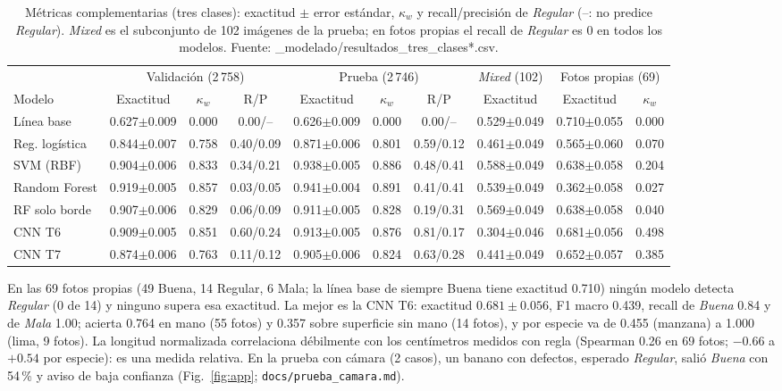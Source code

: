 \documentclass[conference]{IEEEtran}
\begin{document}
\begin{table}[t]
\centering
\caption{M\'etricas complementarias (tres clases): exactitud $\pm$ error est\'andar, $\kappa_w$ y recall/precisi\'on de \emph{Regular} (--: no predice \emph{Regular}). \emph{Mixed} es el subconjunto de 102 im\'agenes de la prueba; en fotos propias el recall de \emph{Regular} es 0 en todos los modelos. Fuente: {\normalfont{}\_modelado/resultados\_tres\_clases*.csv}.}
\label{tab:met}
\scriptsize
\setlength{\tabcolsep}{3.5pt}
\begin{tabular}{@{}l ccc ccc c cc@{}}
\toprule
 & \multicolumn{3}{c}{Validaci\'on (2\,758)} & \multicolumn{3}{c}{Prueba (2\,746)} & \emph{Mixed} (102) & \multicolumn{2}{c}{Fotos propias (69)} \\
\cmidrule(lr){2-4}\cmidrule(lr){5-7}\cmidrule(lr){8-8}\cmidrule(l){9-10}
Modelo & Exactitud & $\kappa_w$ & R/P & Exactitud & $\kappa_w$ & R/P & Exactitud & Exactitud & $\kappa_w$ \\
\midrule
L\'inea base & 0.627$\pm$0.009 & 0.000 & 0.00/-- & 0.626$\pm$0.009 & 0.000 & 0.00/-- & 0.529$\pm$0.049 & 0.710$\pm$0.055 & 0.000 \\
Reg. log\'istica & 0.844$\pm$0.007 & 0.758 & 0.40/0.09 & 0.871$\pm$0.006 & 0.801 & 0.59/0.12 & 0.461$\pm$0.049 & 0.565$\pm$0.060 & 0.070 \\
SVM (RBF) & 0.904$\pm$0.006 & 0.833 & 0.34/0.21 & 0.938$\pm$0.005 & 0.886 & 0.48/0.41 & 0.588$\pm$0.049 & 0.638$\pm$0.058 & 0.204 \\
Random Forest & 0.919$\pm$0.005 & 0.857 & 0.03/0.05 & 0.941$\pm$0.004 & 0.891 & 0.41/0.41 & 0.539$\pm$0.049 & 0.362$\pm$0.058 & 0.027 \\
RF solo borde & 0.907$\pm$0.006 & 0.829 & 0.06/0.09 & 0.911$\pm$0.005 & 0.828 & 0.19/0.31 & 0.569$\pm$0.049 & 0.638$\pm$0.058 & 0.040 \\
CNN T6 & 0.909$\pm$0.005 & 0.851 & 0.60/0.24 & 0.913$\pm$0.005 & 0.876 & 0.81/0.17 & 0.304$\pm$0.046 & 0.681$\pm$0.056 & 0.498 \\
CNN T7 & 0.874$\pm$0.006 & 0.763 & 0.11/0.12 & 0.905$\pm$0.006 & 0.824 & 0.63/0.28 & 0.441$\pm$0.049 & 0.652$\pm$0.057 & 0.385 \\
\bottomrule
\end{tabular}
\end{table}

En las 69 fotos propias (49 Buena, 14 Regular, 6 Mala; la l\'inea base de siempre Buena tiene exactitud 0.710) ning\'un modelo detecta \emph{Regular} (0 de 14) y ninguno supera esa exactitud. La mejor es la CNN T6: exactitud $0.681\pm0.056$, F1 macro 0.439, recall de \emph{Buena} 0.84 y de \emph{Mala} 1.00; acierta 0.764 en mano (55 fotos) y 0.357 sobre superficie sin mano (14 fotos), y por especie va de 0.455 (manzana) a 1.000 (lima, 9 fotos). La longitud normalizada correlaciona d\'ebilmente con los cent\'imetros medidos con regla (Spearman 0.26 en 69 fotos; $-0.66$ a $+0.54$ por especie): es una medida relativa. En la prueba con c\'amara (2 casos), un banano con defectos, esperado \emph{Regular}, sali\'o \emph{Buena} con 54\,\% y aviso de baja confianza (Fig.~\ref{fig:app}; \texttt{docs/prueba\_camara.md}).
\end{document}
